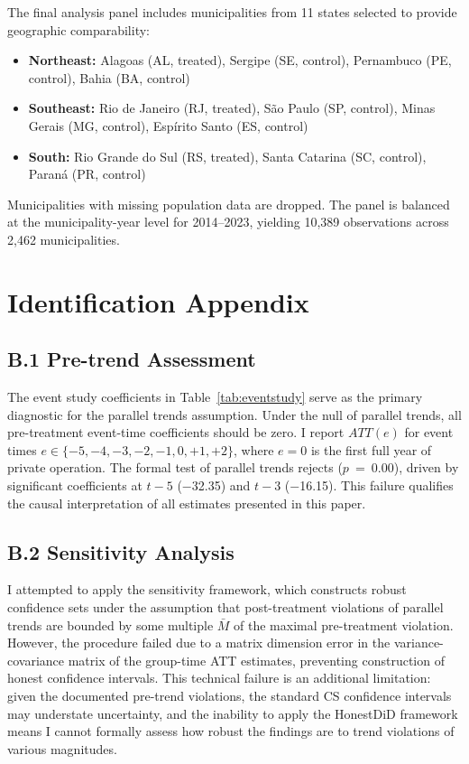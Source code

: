 \documentclass[12pt]{article}
\begin{document}
The final analysis panel includes municipalities from 11 states selected to provide geographic comparability:

\begin{itemize}
\item \textbf{Northeast:} Alagoas (AL, treated), Sergipe (SE, control), Pernambuco (PE, control), Bahia (BA, control)
\item \textbf{Southeast:} Rio de Janeiro (RJ, treated), S\~{a}o Paulo (SP, control), Minas Gerais (MG, control), Esp\'{i}rito Santo (ES, control)
\item \textbf{South:} Rio Grande do Sul (RS, treated), Santa Catarina (SC, control), Paran\'{a} (PR, control)
\end{itemize}

Municipalities with missing population data are dropped. The panel is balanced at the municipality-year level for 2014--2023, yielding 10,389 observations across 2,462 municipalities.

\section{Identification Appendix}
\label{app:identification}

\subsection*{B.1 Pre-trend Assessment}

The event study coefficients in Table~\ref{tab:eventstudy} serve as the primary diagnostic for the parallel trends assumption. Under the null of parallel trends, all pre-treatment event-time coefficients should be zero. I report $ATT(e)$ for event times $e \in \{-5, -4, -3, -2, -1, 0, +1, +2\}$, where $e = 0$ is the first full year of private operation. The formal test of parallel trends rejects ($p$~=~0.00), driven by significant coefficients at $t-5$ ($-$32.35) and $t-3$ ($-$16.15). This failure qualifies the causal interpretation of all estimates presented in this paper.

\subsection*{B.2 Sensitivity Analysis}

I attempted to apply the \citet{rambachan2023honest} sensitivity framework, which constructs robust confidence sets under the assumption that post-treatment violations of parallel trends are bounded by some multiple $\bar{M}$ of the maximal pre-treatment violation. However, the procedure failed due to a matrix dimension error in the variance-covariance matrix of the group-time ATT estimates, preventing construction of honest confidence intervals. This technical failure is an additional limitation: given the documented pre-trend violations, the standard CS confidence intervals may understate uncertainty, and the inability to apply the HonestDiD framework means I cannot formally assess how robust the findings are to trend violations of various magnitudes.
\end{document}
